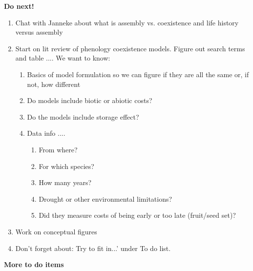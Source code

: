 \documentclass[11pt]{article}
\begin{document}
{\bf \large Do next!} 

\begin{enumerate}
\item Chat with Janneke about what is assembly vs. coexistence and life history versus assembly
\item Start on lit review of phenology coexistence models. Figure out search terms  and table .... We want to know: 
\begin{enumerate}
\item Basics of model formulation so we can figure if they are all the same or, if not, how different
\item Do models include biotic or abiotic costs?
\item Do the models include storage effect?
\item Data info ....
\begin{enumerate}
\item From where?
\item For which species?
\item How many years?
\item Drought or other environmental limitations?
\item Did they measure costs of being early or too late (fruit/seed set)?
\end{enumerate}
\end{enumerate}
\item Work on conceptual figures 
\item Don't forget about: Try to fit in...' under To do list. 
\end{enumerate}

\vspace{2ex}
{\bf \large More to do items} 
\end{document}
